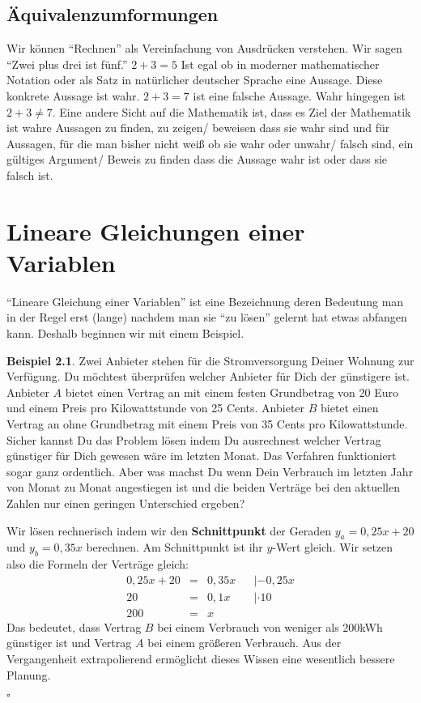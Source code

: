 \documentclass[a4paper]{book}%
\newcommand{\proofsquare}{
    \begin{flushright}
      $\square$
    \end{flushright}\xspace
}
\theoremstyle{definition}
\newtheorem{beispiel}{Beispiel}
\begin{document}
\section{Äquivalenzumformungen}


Wir können \enquote{Rechnen} als Vereinfachung von Ausdrücken verstehen. Wir sagen \enquote{Zwei plus drei ist fünf.} $2+3=5$ Ist egal ob in moderner mathematischer Notation oder als Satz in natürlicher deutscher Sprache eine Aussage. Diese konkrete Aussage ist wahr. $2+3=7$ ist eine falsche Aussage. Wahr hingegen ist $2+3 \neq 7$. Eine andere Sicht auf die Mathematik ist, dass es Ziel der Mathematik ist wahre Aussagen zu finden, zu zeigen/ beweisen dass sie wahr sind und für Aussagen, für die man bisher nicht weiß ob sie wahr oder unwahr/ falsch sind, ein gültiges Argument/ Beweis zu finden dass die Aussage wahr ist oder dass sie falsch ist.


\chapter{Lineare Gleichungen einer Variablen}

\enquote{Lineare Gleichung einer Variablen} ist eine Bezeichnung deren Bedeutung man in der Regel erst (lange) nachdem man sie \enquote{zu lösen} gelernt hat etwas abfangen kann. Deshalb beginnen wir mit einem Beispiel.

\begin{beispiel}
    Zwei Anbieter stehen für die Stromversorgung Deiner Wohnung zur Verfügung. Du möchtest überprüfen welcher Anbieter für Dich der günstigere ist. Anbieter $A$ bietet einen Vertrag an mit einem festen Grundbetrag von 20 Euro und einem Preis pro Kilowattstunde von 25 Cents. Anbieter $B$ bietet einen Vertrag an ohne Grundbetrag mit einem Preis von 35 Cents pro Kilowattstunde. Sicher kannst Du das Problem lösen indem Du ausrechnest welcher Vertrag günstiger für Dich gewesen wäre im letzten Monat. Das Verfahren funktioniert sogar ganz ordentlich. Aber was machst Du wenn Dein Verbrauch im letzten Jahr von Monat zu Monat angestiegen ist und die beiden Verträge bei den aktuellen Zahlen nur einen geringen Unterschied ergeben?

    Wir lösen rechnerisch indem wir den \textbf{Schnittpunkt} der Geraden $y_a = 0,25x + 20$ und $y_b = 0,35x$ berechnen. Am Schnittpunkt ist ihr $y$-Wert gleich. Wir setzen also die Formeln der Verträge gleich:
    \begin{align}\label{eqn:lineareGleichungen1}
      0,25x + 20 &=& 0,35x && | -0,25x \\
      20 &=& 0,1x && | \cdot 10 \\
      200 &=& x &&
    \end{align}
    Das bedeutet, dass Vertrag $B$ bei einem Verbrauch von weniger als 200kWh günstiger ist und Vertrag $A$ bei einem größeren Verbrauch. Aus der Vergangenheit extrapolierend ermöglicht dieses Wissen eine wesentlich bessere Planung.\proofsquare
\end{beispiel}
\end{document}
